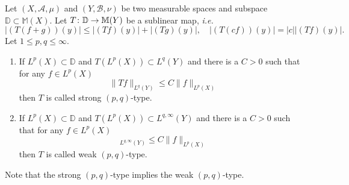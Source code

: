 \begin{defn}
	Let $(X, \mathscr{A}, \mu)$ and $(Y, \mathscr{B}, \nu)$ be two measurable spaces and subspace $\mathbb{D} \subset \mathbb{M}(X)$. Let $T \colon \mathbb{D} \rightarrow \mathbb{M}(Y)$ be a sublinear map, \emph{i.e.}
	\begin{equation*}
		|(T(f+g))(y)| \leq|(T f)(y)|+|(T g)(y)|,\quad |(T(c f))(y)|=|c||(T f)(y)|.
	\end{equation*}
	Let $1 \leq p,q \leq \infty$.
	\begin{enumerate}[label=(\arabic{*})]
		\item If $L^p(X) \subset \mathbb{D}$ and $T(L^p(X)) \subset L^q(Y)$ and there is a $C > 0$ such that for any $f \in L^p(X)$
		\begin{equation*}
			\|T f\|_{L^q(Y)} \leq C\|f\|_{L^p(X)}
		\end{equation*}
		then $T$ is called strong $(p,q)$-type.
		\item If $L^p(X) \subset \mathbb{D}$ and $T(L^p(X)) \subset L^{q,\infty}(Y)$ and there is a $C > 0$ such that for any $f \in L^p(X)$
		\begin{equation*}
			[T f]_{L^{q, \infty}(Y)} \leq C\|f\|_{L^p(X)}
		\end{equation*}
		then $T$ is called weak $(p,q)$-type.
	\end{enumerate}
\end{defn}
Note that the strong $(p,q)$-type implies the weak $(p,q)$-type.


